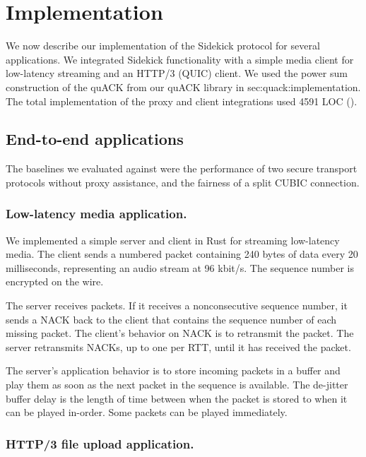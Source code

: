 \section{Implementation}
\label{sec:sidekick:implementation}



We now describe our implementation of the Sidekick protocol for several
applications. We integrated Sidekick functionality with a simple media client
for low-latency streaming and an HTTP/3 (QUIC) client. We used the power sum
construction of the quACK from our quACK library in \Cref
{sec:quack:implementation}. The total implementation of the proxy and client
integrations used 4591 LOC ().

\subsection{End-to-end applications}
\label{sec:sidekick:implementation:applications}

The baselines we evaluated against were the performance of two secure transport
protocols without proxy assistance, and the fairness of a split CUBIC
connection.

\subsubsection{Low-latency media application.}
We implemented a simple server and client in Rust for streaming low-latency
media. The client sends a numbered packet containing 240 bytes of data every
20 milliseconds, representing an audio stream at 96 kbit/s.
The sequence number is encrypted on the wire.

The server receives packets. If it receives a nonconsecutive sequence number,
it sends a NACK back to the client that contains the sequence number of each
missing packet. The client's behavior on NACK is to retransmit the packet. The
server retransmits NACKs, up to one per RTT, until it has received the packet.

The server's application behavior is to store incoming packets in a buffer
and play them as soon as the next packet in the sequence is available. The
de-jitter buffer delay is the length of time between when the packet is stored
to when it can be played in-order. Some packets can be played immediately.

\subsubsection{HTTP/3 file upload application.}

